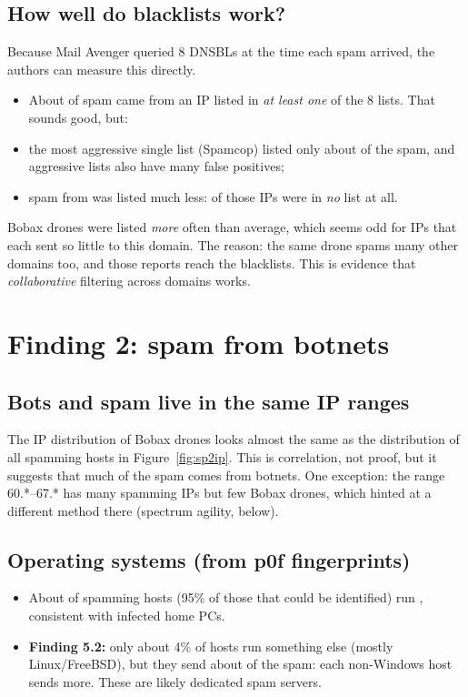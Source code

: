 \subsection{How well do blacklists work?}
Because Mail Avenger queried 8 DNSBLs at the time each spam arrived, the authors can measure this directly.
\begin{itemize}
  \item About  of spam came from an IP listed in \emph{at least one} of the 8 lists. That sounds good, but:
  \item the most aggressive single list (Spamcop) listed only about  of the spam, and aggressive lists also have many false positives;
  \item spam from  was listed much less:  of those IPs were in \emph{no} list at all.
\end{itemize}
Bobax drones were listed \emph{more} often than average, which seems odd for IPs that each sent so little to this domain. The reason: the same drone
spams many other domains too, and those reports reach the blacklists. This is evidence that \emph{collaborative} filtering across domains works.

\section{Finding 2: spam from botnets}

\subsection{Bots and spam live in the same IP ranges}
The IP distribution of Bobax drones looks almost the same as the distribution of all spamming hosts in Figure~\ref{fig:sp2ip}. This is correlation,
not proof, but it suggests that much of the spam comes from botnets. One exception: the range 60.*--67.* has many spamming IPs but few Bobax drones,
which hinted at a different method there (spectrum agility, below).

\subsection{Operating systems (from p0f fingerprints)}
\begin{itemize}
  \item About  of spamming hosts (95\% of those that could be identified) run , consistent with infected home PCs.
  \item \textbf{Finding 5.2:} only about 4\% of hosts run something else (mostly Linux/FreeBSD), but they send about  of the spam: each
        non-Windows host sends more. These are likely dedicated spam servers.
\end{itemize}

